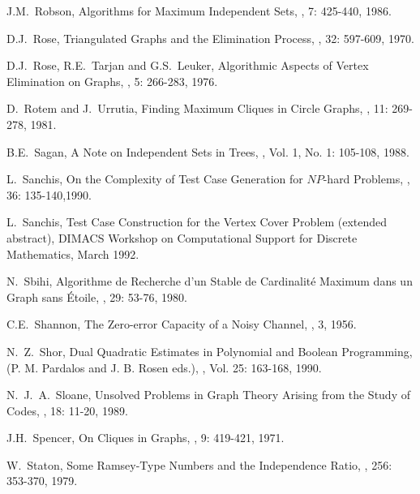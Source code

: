\begin{thebibliography}{10}
J.M.~Robson,
\newblock Algorithms for Maximum Independent Sets,
, 7: 425-440, 1986.

D.J.~Rose,
\newblock Triangulated Graphs and the Elimination Process,
, 32: 597-609, 1970.

D.J.~Rose, R.E.~Tarjan and G.S.~Leuker,
\newblock Algorithmic Aspects of Vertex Elimination on Graphs,
, 5: 266-283, 1976.

D.~Rotem and J.~Urrutia,
\newblock Finding Maximum Cliques in Circle Graphs,
, 11: 269-278, 1981.

B.E.~Sagan,
\newblock A Note on Independent Sets in Trees,
, Vol. 1, No. 1: 105-108, 1988.

L.~Sanchis,
\newblock On the Complexity of Test Case Generation for $NP$-hard
Problems,
, 36: 135-140,1990.

L.~Sanchis,
\newblock Test Case Construction for the Vertex Cover Problem
(extended abstract),
\newblock DIMACS Workshop on Computational Support for Discrete
Mathematics, March 1992.

N.~Sbihi,
\newblock Algorithme de Recherche d'un Stable de Cardinalit\'{e}
Maximum dans un Graph sans \'{E}toile,
, 29: 53-76, 1980.

C.E.~Shannon,
\newblock The Zero-error Capacity of a Noisy Channel,
, 3, 1956.

N.~Z.~Shor,
\newblock Dual Quadratic Estimates in Polynomial and Boolean
Programming,
 (P. M.
Pardalos and J. B. Rosen eds.),
, Vol. 25: 163-168,  
1990.

N.~J.~A.~Sloane,
\newblock Unsolved Problems in Graph Theory Arising from the Study
of Codes,
, 18: 11-20, 1989.

J.H.~Spencer,
\newblock On Cliques in Graphs,
, 9: 419-421, 1971.

W.~Staton,
\newblock Some Ramsey-Type Numbers and the Independence Ratio,
, 256: 353-370, 1979.


\end{thebibliography}
